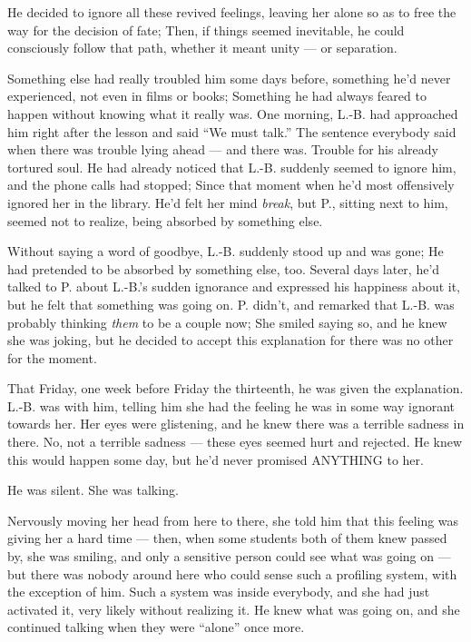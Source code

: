 He decided to ignore all these revived feelings, leaving her alone so as to free the way for the decision of fate; Then, if things seemed inevitable, he could consciously follow that path, whether it meant unity --- or separation.

Something else had really troubled him some days before, something he'd never experienced, not even in films or books; Something he had always feared to happen without knowing what it really was. 
One morning, L.-B. had approached him right after the lesson and said \enquote{We must talk.} The sentence everybody said when there was trouble lying ahead --- and there was. Trouble for his already tortured soul. 
He had already noticed that L.-B. suddenly seemed to ignore him, and the phone calls had stopped; Since that moment when he'd most offensively ignored her in the library. He'd felt her mind \emph{break}, but P., sitting next to him, seemed not to realize, being absorbed by something else.

Without saying a word of goodbye, L.-B. suddenly stood up and was gone; He had pretended to be absorbed by something else, too. Several days later, he'd talked to P. about L.-B.'s sudden ignorance and expressed his happiness about it, but he felt that something was going on. P. didn't, and remarked that L.-B. was probably thinking \emph{them} to be a couple now; She smiled saying so, and he knew she was joking, but he decided to accept this explanation for there was no other for the moment.

That Friday, one week before Friday the thirteenth, he was given the explanation. L.-B. was with him, telling him she had the feeling he was in some way ignorant towards her. 
Her eyes were glistening, and he knew there was a terrible sadness in there. No, not a terrible sadness --- these eyes seemed hurt and rejected. He knew this would happen some day, but he'd never promised ANYTHING to her.

He was silent. 
She was talking.

Nervously moving her head from here to there, she told him that this feeling was giving her a hard time --- then, when some students both of them knew passed by, she was smiling, and only a sensitive person could see what was going on --- but there was nobody around here who could sense such a profiling system, with the exception of him. Such a system was inside everybody, and she had just activated it, very likely without realizing it. He knew what was going on, and she continued talking when they were \enquote{alone} once more.

